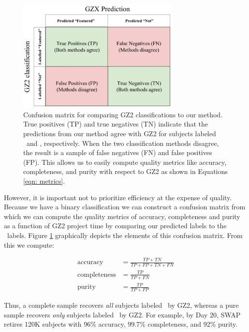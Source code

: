 \begin{figure} 
\centering
\includegraphics[width=3.2in]{Figures/human_machine/f4.pdf}
\caption[Confusion matrix between predictions and ground truth defines quality metrics.]{Confusion matrix for comparing GZ2 classifications to our method.  True positives (TP) and true negatives (TN) indicate that the predictions from our method agree with GZ2 for subjects labeled \feat~and \notfeat, respectively. When the two classification methods disagree, the result is a sample of false negatives (FN) and false positives (FP). This allows us to easily compute  quality metrics like accuracy, completeness, and purity with respect to GZ2 as shown in Equations \ref{eqn: metrics}.} 
\label{fig: confusion matrix}
\end{figure}

However, it is important not to prioritize efficiency at the expense of quality. Because we have a binary classification we can construct a confusion matrix from which we can compute the quality metrics of accuracy, completeness and purity as a function of GZ2 project time by comparing our predicted labels to the \raw~labels. Figure \ref{fig: confusion matrix}
graphically depicts the elements of this confusion matrix. From this we compute: 
 
\begin{align*}\label{eqn: metrics}
\mathrm{accuracy} &= \frac{TP + TN}{TP + FP + TN + FN} \\
\mathrm{completeness} &= \frac{TP}{TP +FN }\tag{3} \\
\mathrm{purity} &= \frac{TP}{TP + FP}
\end{align*}

Thus, a complete sample recovers \textit{all} subjects labeled \feat~by GZ2, whereas a pure sample recovers \textit{only} subjects labeled \feat~by GZ2. For example, by Day 20, SWAP retires 120K subjects with 96\% accuracy, 99.7\% completeness, and 92\% purity. 

